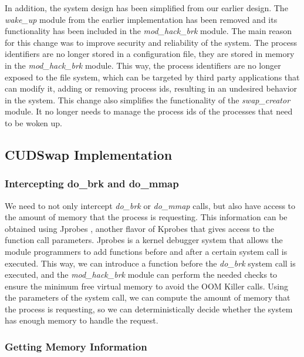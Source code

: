 In addition, the system design has been simplified from our earlier
design. The {\it wake\_up} module from the earlier implementation has been
removed and its functionality has been included in the {\it mod\_hack\_brk}
module. The main reason for this change was to improve security
and reliability of the system. The process identifiers are no longer
stored in a configuration file, they are stored in memory in the
{\it mod\_hack\_brk} module. This way, the process identifiers are no
longer exposed to the file system, which can be targeted by third party
applications that can modify it, adding or removing process ids, resulting
in an undesired behavior in the system. This change also simplifies the
functionality of the {\it swap\_creator} module. It no longer needs to
manage the process ids of the processes that need to be woken up.

\subsection{CUDSwap Implementation}\label{sub_cudswap_Implementation}

\subsubsection{Intercepting do\_brk and do\_mmap}

We need to not only intercept {\it do\_brk} or {\it do\_mmap} calls,
but also have access to the amount of memory that the process is requesting.
This information can be obtained using Jprobes \cite{Mavinakayahalli1006Linux}, another
flavor of Kprobes \cite{Krishnakumar2005} that gives access to the function call
parameters. Jprobes is a kernel debugger system that allows the module
programmers to add functions before and after a certain system call is
executed. This way, we can introduce a function before the {\it do\_brk}
system call is executed, and the {\it mod\_hack\_brk} module can perform
the needed checks to ensure the minimum free virtual memory to avoid
the OOM Killer calls. Using the parameters of the system call, we can
compute the amount of memory that the process is requesting, so we can
deterministically decide whether the system has enough memory to handle
the request.

\subsubsection{Getting Memory Information}

